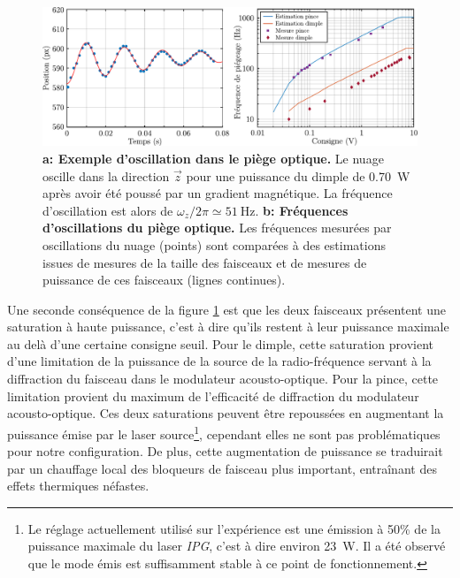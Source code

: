 \begin{figure}
\centering
\includegraphics[width=\textwidth]{../Fig/Modif_exp/frequences_piege_optique.pdf}
\caption{\textbf{a: Exemple d'oscillation dans le piège optique.} Le nuage oscille dans la direction $\vec{z}$ pour une puissance du dimple de \SI{0.70}{\watt} après avoir été poussé par un gradient magnétique. La fréquence d'oscillation est alors de $\omega_z /2\pi \simeq \SI{51}{\hertz}$. \textbf{b: Fréquences d'oscillations du piège optique.} Les fréquences mesurées par oscillations du nuage (points) sont comparées à des estimations issues de mesures de la taille des faisceaux et de mesures de puissance de ces faisceaux (lignes continues).}
\label{fig:frequences_piege_optique}
\end{figure}



Une seconde conséquence de la figure \ref{fig:frequences_piege_optique} est que les deux faisceaux présentent une saturation à haute puissance, c'est à dire qu'ils restent à leur puissance maximale au delà d'une certaine consigne seuil. Pour le dimple, cette saturation provient d'une limitation de la puissance de la source de la radio-fréquence servant à la diffraction du faisceau dans le modulateur acousto-optique. Pour la pince, cette limitation provient du maximum de l'efficacité de diffraction du modulateur acousto-optique. Ces deux saturations peuvent être repoussées en augmentant la puissance émise par le laser source\footnote{Le réglage actuellement utilisé sur l'expérience est une émission à 50\% de la puissance maximale du laser \emph{IPG}, c'est à dire environ \SI{23}{\watt}. Il a été observé que le mode émis est suffisamment stable à ce point de fonctionnement.}, cependant elles ne sont pas problématiques pour notre configuration. De plus, cette augmentation de puissance se traduirait par un chauffage local des bloqueurs de faisceau plus important, entraînant des effets thermiques néfastes.













